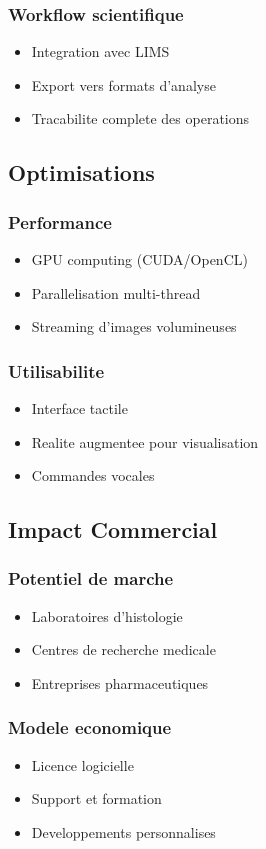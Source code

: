 \documentclass[12pt,a4paper]{article}
\begin{document}
\subsubsection{Workflow scientifique}
\begin{itemize}
\item Integration avec LIMS
\item Export vers formats d'analyse
\item Tracabilite complete des operations
\end{itemize}

\subsection{Optimisations}

\subsubsection{Performance}
\begin{itemize}
\item GPU computing (CUDA/OpenCL)
\item Parallelisation multi-thread
\item Streaming d'images volumineuses
\end{itemize}

\subsubsection{Utilisabilite}
\begin{itemize}
\item Interface tactile
\item Realite augmentee pour visualisation
\item Commandes vocales
\end{itemize}

\subsection{Impact Commercial}

\subsubsection{Potentiel de marche}
\begin{itemize}
\item Laboratoires d'histologie
\item Centres de recherche medicale
\item Entreprises pharmaceutiques
\end{itemize}

\subsubsection{Modele economique}
\begin{itemize}
\item Licence logicielle
\item Support et formation
\item Developpements personnalises
\end{itemize}
\end{document}
